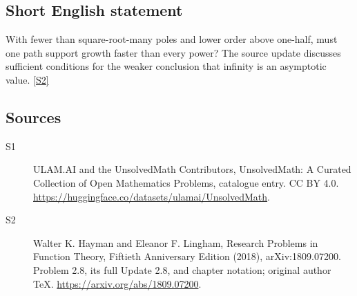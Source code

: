 \documentclass[11pt]{article}
\newcommand{\sref}[2]{\hyperlink{source:#1:#2}{[S#2]}}
\begin{document}
\subsection{Short English statement}
With fewer than square-root-many poles and lower order above one-half, must one path support growth faster than every power? The source update discusses sufficient conditions for the weaker conclusion that infinity is an asymptotic value. \sref{statement}{2}
\subsection{Sources}
\begin{description}
\item[\hypertarget{source:statement:1}{S1}] ULAM.AI and the UnsolvedMath Contributors, UnsolvedMath: A Curated Collection of Open Mathematics Problems, catalogue entry. CC BY 4.0. \url{https://huggingface.co/datasets/ulamai/UnsolvedMath}.
\item[\hypertarget{source:statement:2}{S2}] Walter K. Hayman and Eleanor F. Lingham, Research Problems in Function Theory, Fiftieth Anniversary Edition (2018), arXiv:1809.07200. Problem 2.8, its full Update 2.8, and chapter notation; original author TeX. \url{https://arxiv.org/abs/1809.07200}.
\end{description}
\label{end:statement}
\end{document}
